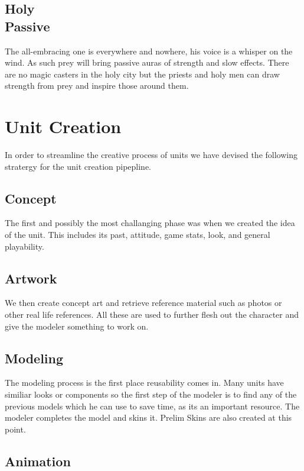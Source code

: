 \documentclass[a4paper]{article}
\begin{document}
\subsection{Holy \\ Passive}

The all-embracing one is everywhere and nowhere, his voice is a whisper on the wind. As such prey will bring passive auras of strength and slow effects. There are no magic casters in the holy city but the priests and holy men can draw strength from prey and inspire those around them.


\newpage \section{Unit Creation}

In order to streamline the creative process of units we have devised the following stratergy for the unit creation pipepline.

\subsection{Concept}

The first and possibly the most challanging phase was when we created the idea of the unit. This includes its past, attitude, game stats, look, and general playability.

\subsection{Artwork}

We then create concept art and retrieve reference material such as photos or other real life references. All these are used to further flesh out the character and give the modeler something to work on.

\subsection{Modeling}

The modeling process is the first place reusability comes in. Many units have similiar looks or components so the first step of the modeler is to find any of the previous models which he can use to save time, as its an important resource. The modeler completes the model and skins it. Prelim Skins are also created at this point.

\subsection{Animation}
\end{document}
